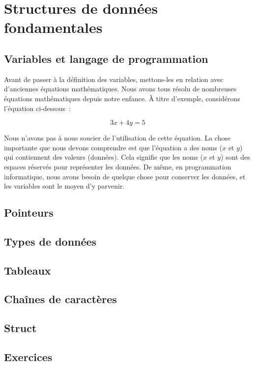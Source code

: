 \chapter{Structures de donn\'ees fondamentales}
\minitoc


\section{Variables et langage de programmation}

Avant de passer à la définition des variables, mettons-les en relation avec d'anciennes équations mathématiques. Nous avons tous résolu de nombreuses équations mathématiques depuis notre enfance. À titre d'exemple, considérons l'équation ci-dessous :

\begin{equation*}
	3x + 4y = 5
\end{equation*}

Nous n’avons pas à nous soucier de l’utilisation de cette équation. La chose importante que nous devons comprendre est que l’équation a des noms ($x$ et $y$) qui contiennent des valeurs (données). Cela signifie que les noms ($x$ et $y$) sont des espaces réservés pour représenter les données. De même, en programmation informatique, nous avons besoin de quelque chose pour conserver les données, et les variables sont le moyen d'y parvenir.

\section{Pointeurs}
\section{Types de données}
\section{Tableaux}
\section{Chaînes de caractères}
\section{Struct}

\section{Exercices}
